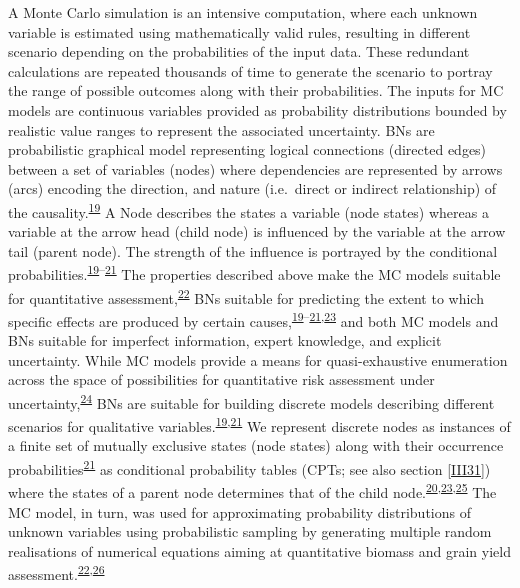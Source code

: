 \documentclass[12pt,oneside]{article}
\begin{document}
A Monte Carlo simulation is an intensive computation, where each unknown variable is estimated using mathematically valid rules, resulting in different scenario depending on the probabilities of the input data. These redundant calculations are repeated thousands of time to generate the scenario to portray the range of possible outcomes along with their probabilities. The inputs for MC models are continuous variables provided as probability distributions bounded by realistic value ranges to represent the associated uncertainty. BNs are probabilistic graphical model representing logical connections (directed edges) between a set of variables (nodes) where dependencies are represented by arrows (arcs) encoding the direction, and nature (i.e.~direct or indirect relationship) of the causality.\textsuperscript{\protect\hyperlink{ref-Pearl_1988}{19}} A Node describes the states a variable (node states) whereas a variable at the arrow head (child node) is influenced by the variable at the arrow tail (parent node). The strength of the influence is portrayed by the conditional probabilities.\textsuperscript{\protect\hyperlink{ref-Pearl_1988}{19}--\protect\hyperlink{ref-Jensen_1996}{21}}
The properties described above make the MC models suitable for quantitative assessment,\textsuperscript{\protect\hyperlink{ref-Hubbard_2014}{22}} BNs suitable for predicting the extent to which specific effects are produced by certain causes,\textsuperscript{\protect\hyperlink{ref-Pearl_1988}{19}--\protect\hyperlink{ref-Jensen_1996}{21},\protect\hyperlink{ref-Scutari_and_Denis_2015}{23}} and both MC models and BNs suitable for imperfect information, expert knowledge, and explicit uncertainty. While MC models provide a means for quasi-exhaustive enumeration across the space of possibilities for quantitative risk assessment under uncertainty,\textsuperscript{\protect\hyperlink{ref-Rosenstock_et_al_2014}{24}} BNs are suitable for building discrete models describing different scenarios for qualitative variables.\textsuperscript{\protect\hyperlink{ref-Pearl_1988}{19},\protect\hyperlink{ref-Jensen_1996}{21}} We represent discrete nodes as instances of a finite set of mutually exclusive states (node states) along with their occurrence probabilities\textsuperscript{\protect\hyperlink{ref-Jensen_1996}{21}} as conditional probability tables (CPTs; see also section \ref{III31}) where the states of a parent node determines that of the child node.\textsuperscript{\protect\hyperlink{ref-Fenton_and_Neil_2013}{20},\protect\hyperlink{ref-Scutari_and_Denis_2015}{23},\protect\hyperlink{ref-Jensen_and_Nielsen_2007}{25}} The MC model, in turn, was used for approximating probability distributions of unknown variables using probabilistic sampling by generating multiple random realisations of numerical equations aiming at quantitative biomass and grain yield assessment.\textsuperscript{\protect\hyperlink{ref-Hubbard_2014}{22},\protect\hyperlink{ref-Luedeling_et_al_2015}{26}}
\end{document}
